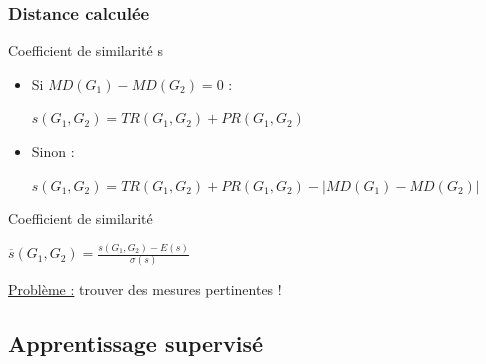 \documentclass{beamer}
\begin{document}
\begin{frame}
\frametitle{Distance calculée}

\begin{block}{Coefficient de similarité s}
\begin{itemize}
\item Si $MD(G_{1}) - MD(G_{2}) = 0$ : 
\begin{center}
$ s(G_{1},G_{2}) = TR(G_{1},G_{2}) + PR(G_{1},G_{2})$
\end{center}
\item Sinon : 
\begin{center}
$ s(G_{1},G_{2}) = TR(G_{1},G_{2}) + PR(G_{1},G_{2}) - | MD(G_{1}) - MD(G_{2}) |$
\end{center}
\end{itemize}
\end{block}

\begin{block}{Coefficient de similarité }
\begin{center}
$\overline{s}(G_{1},G_{2}) = \frac{s(G_{1},G_{2}) - E(s)}{\sigma(s)}$
\end{center}
\end{block}



\uline{Problème :} trouver des mesures pertinentes !


\end{frame}

\subsection{Apprentissage supervisé}
\end{document}
